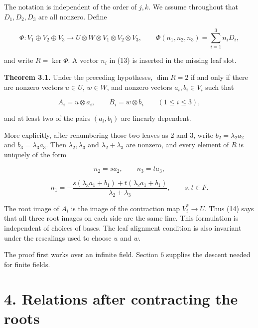 \documentclass[11pt]{article}
\begin{document}
The notation is independent of the order of $j,k$. We assume throughout that $D_1,D_2,D_3$ are all nonzero. Define


\nopagebreak[4]

\begin{equation}
\Phi:V_1\oplus V_2\oplus V_3\longrightarrow U\otimes W\otimes V_1\otimes V_2\otimes V_3,\qquad
\Phi(n_1,n_2,n_3)=\sum_{i=1}^{3}n_iD_i,
\tag{13}
\end{equation}

and write $R=\ker\Phi$. A vector $n_i$ in (13) is inserted in the missing leaf slot.


\textbf{Theorem 3.1.} Under the preceding hypotheses, $\dim R=2$ if and only if there are nonzero vectors $u\in U$, $w\in W$, and nonzero vectors $a_i,b_i\in V_i$ such that


\nopagebreak[4]

\begin{equation}
A_i=u\otimes a_i,\qquad B_i=w\otimes b_i\qquad(1\leq i\leq3),
\tag{14}
\end{equation}

and at least two of the pairs $(a_i,b_i)$ are linearly dependent.


More explicitly, after renumbering those two leaves as 2 and 3, write $b_2=\lambda_2a_2$ and $b_3=\lambda_3a_3$. Then $\lambda_2,\lambda_3$ and $\lambda_2+\lambda_3$ are nonzero, and every element of $R$ is uniquely of the form


\nopagebreak[4]

\begin{equation}
n_2=sa_2,\qquad n_3=ta_3,
\tag{15}
\end{equation}

\begin{equation}
n_1=-\frac{s(\lambda_3a_1+b_1)+t(\lambda_2a_1+b_1)}{\lambda_2+\lambda_3},
\qquad s,t\in F.
\tag{16}
\end{equation}

The root image of $A_i$ is the image of the contraction map $V_i^*\to U$. Thus (14) says that all three root images on each side are the same line. This formulation is independent of choices of bases. The leaf alignment condition is also invariant under the rescalings used to choose $u$ and $w$.


The proof first works over an infinite field. Section 6 supplies the descent needed for finite fields.


\section*{4. Relations after contracting the roots}
\end{document}
